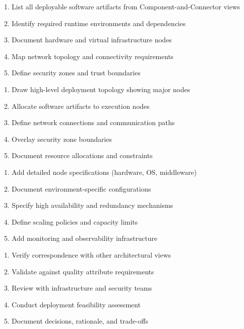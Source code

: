 \documentclass[11pt,letterpaper]{article}
\begin{document}
\begin{guidancebox}
\begin{enumerate}[nosep]
    \item List all deployable software artifacts from Component-and-Connector views
    \item Identify required runtime environments and dependencies
    \item Document hardware and virtual infrastructure nodes
    \item Map network topology and connectivity requirements
    \item Define security zones and trust boundaries
\end{enumerate}
\end{guidancebox}

\begin{guidancebox}
\begin{enumerate}[nosep]
    \item Draw high-level deployment topology showing major nodes
    \item Allocate software artifacts to execution nodes
    \item Define network connections and communication paths
    \item Overlay security zone boundaries
    \item Document resource allocations and constraints
\end{enumerate}
\end{guidancebox}

\begin{guidancebox}
\begin{enumerate}[nosep]
    \item Add detailed node specifications (hardware, OS, middleware)
    \item Document environment-specific configurations
    \item Specify high availability and redundancy mechanisms
    \item Define scaling policies and capacity limits
    \item Add monitoring and observability infrastructure
\end{enumerate}
\end{guidancebox}

\begin{guidancebox}
\begin{enumerate}[nosep]
    \item Verify correspondence with other architectural views
    \item Validate against quality attribute requirements
    \item Review with infrastructure and security teams
    \item Conduct deployment feasibility assessment
    \item Document decisions, rationale, and trade-offs
\end{enumerate}
\end{guidancebox}
\end{document}
